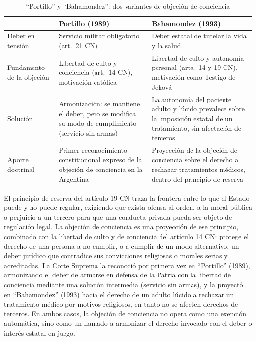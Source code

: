 \documentclass[12pt,oneside]{book}
\begin{document}
\begin{table}[H]
\centering
\caption{``Portillo'' y ``Bahamondez'': dos variantes de objeción de conciencia}
\begin{tabularx}{\textwidth}{@{}lXX@{}}
\toprule
& \textbf{Portillo (1989)} & \textbf{Bahamondez (1993)} \\
\midrule
Deber en tensión & Servicio militar obligatorio (art.\ 21 CN) & Deber estatal de
tutelar la vida y la salud \\
Fundamento de la objeción & Libertad de culto y conciencia (art.\ 14 CN),
motivación católica & Libertad de culto y autonomía personal (arts.\ 14 y 19 CN),
motivación como Testigo de Jehová \\
Solución & Armonización: se mantiene el deber, pero se modifica su modo de
cumplimiento (servicio sin armas) & La autonomía del paciente adulto y lúcido
prevalece sobre la imposición estatal de un tratamiento, sin afectación de
terceros \\
Aporte doctrinal & Primer reconocimiento constitucional expreso de la objeción de
conciencia en la Argentina & Proyección de la objeción de conciencia sobre el
derecho a rechazar tratamientos médicos, dentro del principio de reserva \\
\bottomrule
\end{tabularx}
\end{table}

\begin{exambox}
El principio de reserva del artículo 19 CN traza la frontera entre lo que el
Estado puede y no puede regular, exigiendo que exista ofensa al orden, a la moral
pública o perjuicio a un tercero para que una conducta privada pueda ser objeto de
regulación legal. La objeción de conciencia es una proyección de ese principio,
combinado con la libertad de culto y de conciencia del artículo 14 CN: protege el
derecho de una persona a no cumplir, o a cumplir de un modo alternativo, un deber
jurídico que contradice sus convicciones religiosas o morales serias y
acreditadas. La Corte Suprema la reconoció por primera vez en ``Portillo''
(1989), armonizando el deber de armarse en defensa de la Patria con la libertad
de conciencia mediante una solución intermedia (servicio sin armas), y la
proyectó en ``Bahamondez'' (1993) hacia el derecho de un adulto lúcido a rechazar
un tratamiento médico por motivos religiosos, en tanto no se afecten derechos de
terceros. En ambos casos, la objeción de conciencia no opera como una exención
automática, sino como un llamado a armonizar el derecho invocado con el deber o
interés estatal en juego.
\end{exambox}
\end{document}
